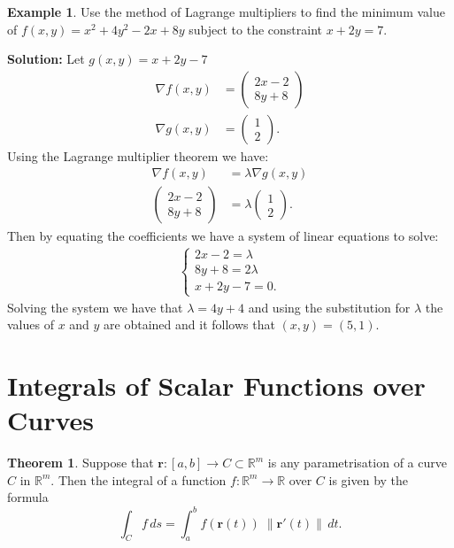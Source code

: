 \documentclass[12pt, a4paper]{article}
\newcommand{\bb}[1]{\mathbb{#1}}
\newcommand{\mb}[1]{\mathbf{#1}}
\theoremstyle{definition}
\newtheorem{theorem}{Theorem}[section]
\newtheorem*{example}{Example}
\theoremstyle{plain}
\begin{document}
\begin{example}
Use the method of Lagrange multipliers to find the minimum value of $f(x, y) = x^2 + 4y^2 - 2x + 8y$ subject to the constraint $x + 2y = 7.$

\textbf{Solution:} Let $g(x,y)=x+2y-7$
$$\begin{aligned}
\nabla f(x,y) &= \begin{pmatrix} 2x-2 \\ 8y+8 \end{pmatrix} \\
\nabla g(x,y) &= \begin{pmatrix} 1 \\ 2 \end{pmatrix}. 
\end{aligned}$$ Using the Lagrange multiplier theorem we have: $$\begin{aligned}
\nabla f(x,y) &=\lambda \nabla g(x,y) \\
\begin{pmatrix} 2x-2 \\ 8y+8 \end{pmatrix} &= \lambda\begin{pmatrix} 1 \\ 2 \end{pmatrix}. 
\end{aligned}$$ Then by equating the coefficients we have a system of linear equations to solve:$$\begin{aligned}
\begin{cases}
2x-2=\lambda \\
8y+8=2\lambda\\
x+2y-7=0.
\end{cases}
\end{aligned}$$ Solving the system we have that $\lambda=4y+4$ and using the substitution for $\lambda$ the values of $x$ and $y$ are obtained and it follows that $(x,y)=(5,1).$
\end{example}

\section{Integrals of Scalar Functions over Curves}

\begin{theorem}
Suppose that $\mb{r} : [a,b] \to C \subset \bb{R}^m$ is any parametrisation of a curve $C$ in $\bb{R}^m.$ Then the integral of a function $f : \bb{R}^m \to \bb{R}$ over $C$ is given by the formula $$\int_C f \, ds=\int_{a}^{b}f(\mb{r}(t)) \; \|\mb{r'}(t)\|\,dt.$$
\end{theorem}
\end{document}
